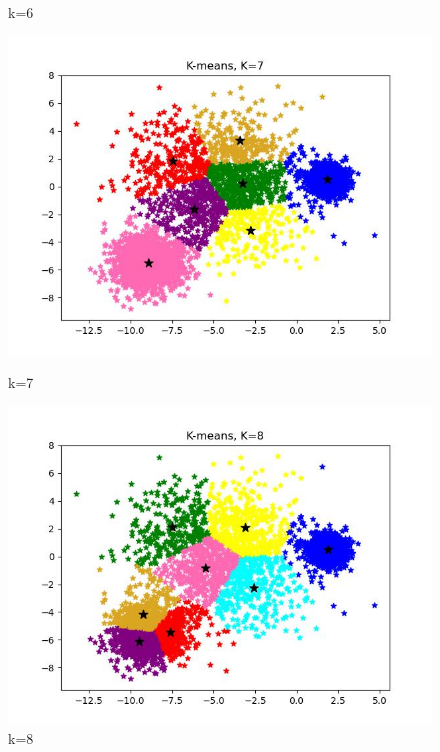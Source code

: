 \documentclass[UTF8]{ctexart}
\begin{document}
\begin{figure}[H]
\begin{minipage}{0.32\linewidth}
		\caption{k=6}
		\label{chutian2}%
	\end{minipage}

  \begin{minipage}{0.32\linewidth}
		\centering
		\includegraphics[width=0.9\linewidth]{k=7.jpg}
		\caption{k=7}
		\label{chutian1}%
	\end{minipage}
	\begin{minipage}{0.32\linewidth}
		\centering
		\includegraphics[width=0.9\linewidth]{k=8.jpg}
		\caption{k=8}
		\label{chutian2}%
	\end{minipage}
  \begin{minipage}{0.32\linewidth}
		\centering

\end{minipage}
\end{figure}
\end{document}

